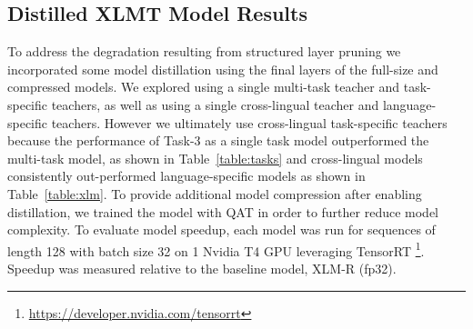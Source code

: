 \documentclass[letterpaper]{article} %
\begin{document}
\subsection*{Distilled XLMT Model Results}
To address the degradation resulting from structured layer pruning we incorporated some model distillation using the final layers of the full-size and compressed models.
We explored using a single multi-task teacher and task-specific teachers, as well as using a single cross-lingual teacher and language-specific teachers.
However we ultimately use cross-lingual task-specific teachers because the performance of Task-3 as a single task model outperformed the multi-task model, as shown in Table~\ref{table:tasks} and cross-lingual models consistently out-performed language-specific models as shown in Table~\ref{table:xlm}.
To provide additional model compression after enabling distillation, we trained the model with QAT in order to further reduce model complexity.
To evaluate model speedup, each model was run for sequences of length 128 with batch size 32 on 1 Nvidia T4 GPU leveraging TensorRT \footnote{\url{https://developer.nvidia.com/tensorrt}}.
Speedup was measured relative to the baseline model, XLM-R (fp32). 


\begin{table}[!htb]
\centering
\renewcommand{\arraystretch}{1.2}
\caption{
Results on model distillation and quantization aware training. 
Task-1, Task-2, and Task-3 results are reported in macro-F1 scores.  
XLM-R models were used as the teacher in all results, except for MiniLM-L12-mBert which used mBert teachers.
}
\label{table:distill}
\end{table}
\end{document}
